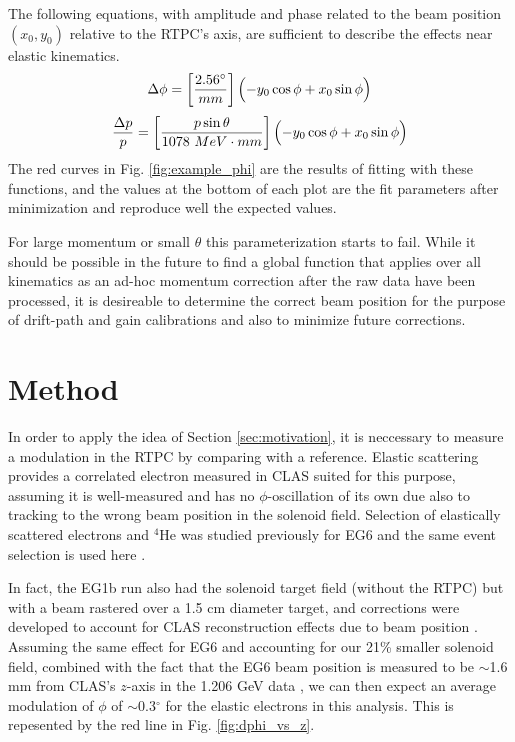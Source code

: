\documentclass[amsmath,amssymb,notitlepage,12pt]{revtex4-1}
\begin{document}
The following equations, with amplitude and phase related to the beam position $(x_0,y_0)$ relative to the RTPC's axis, are sufficient to describe the effects near elastic kinematics.%
\begin{equation}
    \Delta\phi = \left[\frac{2.56^\circ}{mm}\right] \Bigl(-y_0 \cos\phi + x_0 \sin\phi\Bigr)
    \label{eq:phi}
\end{equation}
\begin{equation}
    \frac{\Delta p}{p} = \left[\frac{p\sin\theta}{1078\ MeV\cdot mm}\right] \Bigl(-y_0 \cos\phi + x_0 \sin\phi\Bigr)
    \label{eq:mom}
\end{equation}
The red curves in Fig. \ref{fig:example_phi} are the results of fitting with these functions, and the values at the bottom of each plot are the fit parameters after minimization and reproduce well the expected values.

For large momentum or small $\theta$ this parameterization starts to fail.  While it should be possible in the future to find a global function that applies over all kinematics as an ad-hoc momentum correction after the raw data have been processed, it is desireable to determine the correct beam position for the purpose of drift-path and gain calibrations and also to minimize future corrections.

\section{Method}\label{sec:method}
In order to apply the idea of Section \ref{sec:motivation}, it is neccessary to measure a modulation in the RTPC by comparing with a reference.  Elastic scattering provides a correlated electron measured in CLAS suited for this purpose, assuming it is well-measured and has no $\phi$-oscillation of its own due also to tracking to the wrong beam position in the solenoid field.  Selection of elastically scattered electrons and $^4$He was studied previously for EG6 and the same event selection is used here \cite{driftpaths,gains}. 

In fact, the EG1b run also had the solenoid target field (without the RTPC) but with a beam rastered over a 1.5 cm diameter target, and corrections were developed to account for CLAS reconstruction effects due to beam position \cite{eg1braster}.  Assuming the same effect for EG6 and accounting for our 21\% smaller solenoid field, combined with the fact that the 
EG6 beam position is measured to be $\sim$1.6 mm from CLAS's $z$-axis in the 1.206 GeV data \cite{clasbeamoffset}, we can then expect an average modulation of $\phi$ of $\sim$0.3$^\circ$ for the elastic electrons in this analysis.  This is repesented by the red line in Fig. \ref{fig:dphi_vs_z}.
\end{document}

